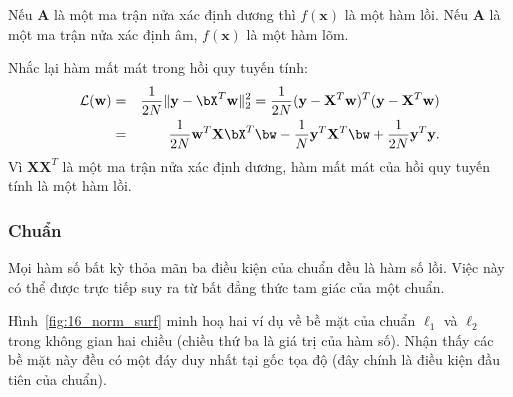 Nếu $\mathbf{A}$ là một ma trận nửa xác định dương thì $f(\mathbf{x})$ là một
hàm lồi. Nếu $\mathbf{A}$ là một ma trận nửa xác định âm, $f(\mathbf{x})$
là một hàm lõm.
 
Nhắc lại hàm mất mát trong hồi quy tuyến tính:
\begin{eqnarray*} 
\mathcal{L}(\mathbf{w}) &=& \frac{1}{2N} \|\mathbf{y} -
\bX^T\mathbf{w}\|_2^2 = \frac{1}{2N} (\mathbf{y} -
\mathbf{X}^T\mathbf{w})^T(\mathbf{y} - \mathbf{X}^T\mathbf{w})  \\\ 
&=& \frac{1}{2N} \mathbf{w}^T\mathbf{X}\bX^T\bw -
\frac{1}{N}\mathbf{y}^T\mathbf{X}^T\bw + \frac{1}{2N}\mathbf{y}^T\mathbf{y}.
\end{eqnarray*} 
Vì $\mathbf{X}\mathbf{X}^T$ là một ma trận nửa xác định dương, hàm mất mát của
hồi quy tuyến tính là một hàm lồi.
 
 
\subsubsection{Chuẩn}
Mọi hàm số bất kỳ thỏa mãn ba điều kiện của chuẩn đều là hàm số lồi. Việc này có thể
được trực tiếp suy ra từ bất đẳng thức tam giác của một chuẩn. 


Hình~\ref{fig:16_norm_surf} minh hoạ hai ví dụ về bề mặt của chuẩn $\ell_1$ và
$\ell_2$
trong không gian hai chiều (chiều thứ ba là giá trị của hàm
số). Nhận thấy các bề mặt này đều có {một đáy duy nhất} tại gốc tọa độ (đây chính là điều kiện đầu tiên của chuẩn). 


